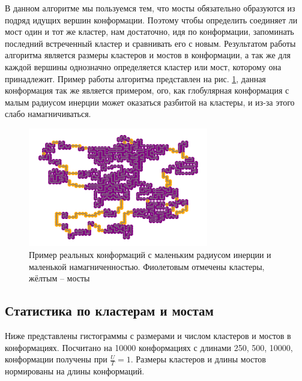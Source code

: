 В данном алгоритме мы пользуемся тем, что мосты обязательно образуются из подряд идущих вершин конформации. Поэтому чтобы определить соединяет ли мост один и тот же кластер, нам достаточно, идя по конформации, запоминать последний встреченный кластер и сравнивать его с новым.
Результатом работы алгоритма является размеры кластеров и мостов в конформации, а так же для каждой вершины однозначно определяется кластер или мост, которому она принадлежит. Пример работы алгоритма представлен на рис. \ref{fig:clusters_and_bridges}, данная конформация так же является примером, ого, как глобулярная конформация с малым радиусом инерции может оказаться разбитой на кластеры, и из-за этого слабо намагничиваться.

\begin{figure}[ht]
	\centering
	\includegraphics[width=0.70\textwidth]{../images/bridges_example_1.png}  
	\caption{Пример реальных конформаций с маленьким радиусом инерции и маленькой намагниченностью. Фиолетовым отмечены кластеры, жёлтым -- мосты}
	\label{fig:clusters_and_bridges}
\end{figure}

\subsection{Статистика по кластерам и мостам}
Ниже представлены гистограммы с размерами и числом кластеров и мостов в конформациях. Посчитано на 10000 конформациях с длинами 250, 500, 10000, конформации получены при $\frac{U}{T} = 1$. Размеры кластеров и длины мостов нормированы на длины конформаций. 



